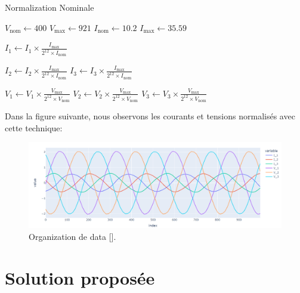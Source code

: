 \begin{algorithm}[H]
  \caption{Normalization Nominale}
  
  \Initialization{}


  \( V_{\text{nom}} \gets 400 \) \;
  \( V_{\text{max}} \gets 921 \) \;
  \( I_{\text{nom}} \gets 10.2 \) \;
  \( I_{\text{max}} \gets 35.59 \) \;
  
  \Normalization{}


  \( I_1 \gets I_1 \times \frac{I_{\text{max}}}{2^{12} \times I_{\text{nom}}} \) \;


  \( I_2 \gets I_2 \times \frac{I_{\text{max}}}{2^{12} \times I_{\text{nom}}} \) \;
  \( I_3 \gets I_3 \times \frac{I_{\text{max}}}{2^{12} \times I_{\text{nom}}} \) \;
  
  \( V_1 \gets V_1 \times \frac{V_{\text{max}}}{2^{12} \times V_{\text{nom}}} \) \;
  \( V_2 \gets V_2 \times \frac{V_{\text{max}}}{2^{12} \times V_{\text{nom}}} \) \;
  \( V_3 \gets V_3 \times \frac{V_{\text{max}}}{2^{12} \times V_{\text{nom}}} \) \;
  
  
  \end{algorithm}
    \FloatBarrier



Dans la figure suivante, nous observons les courants et tensions normalisés avec cette technique: 


\begin{figure}[hbt!]
  \centering
  \includegraphics[width=12cm]{images_pfe/normalization_nominale.png}
  \caption{Organization de data [\cite{yoon2019time}].}
  \label{fig:data_norm}
\end{figure}
\FloatBarrier

\section{Solution proposée}

